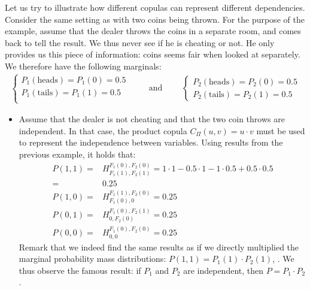 \begin{example}\label{ex:copulas}
    Let us try to illustrate how different copulas can represent different dependencies. 
    Consider the same setting as  with two coins being thrown. For the purpose of the example, assume that the dealer throws the coins in a separate room, and comes back to tell the result. We thus never see if he is cheating or not. He only provides us this piece of information: coins seems fair when looked at separately. We therefore have the following marginals:
    \begin{eqnarray*}
    \begin{cases}
        P_1(\text{heads}) = P_1(0) = 0.5\\
        P_1(\text{tails}) = P_1(1) = 0.5\\
    \end{cases}
    \qquad\text{ and }\qquad
    \begin{cases}
        P_2(\text{heads}) = P_2(0) = 0.5\\
        P_2(\text{tails}) = P_2(1) = 0.5
    \end{cases}
    \end{eqnarray*}
    
    \begin{itemize}
        \item Assume that the dealer is not cheating and that the two coin throws are independent. In that case, the product copula $C_\Pi(u,v)=u\cdot v$ must be used to represent the independence between variables.
        Using results from the previous example, it holds that:
        \begin{align*}
            P(1,1) =& H_{F_1(1), F_2(1)}^{F_1(0), F_2(0)} = 1\cdot1 - 0.5\cdot1 - 1\cdot0.5 + 0.5\cdot0.5\\
            =& 0.25\\
            P(1,0) =& H_{F_1(0), 0}^{F_1(1), F_2(0)} = 0.25 \\
            P(0,1) =& H_{0, F_2(0)}^{F_1(0), F_2(1)} = 0.25 \\
            P(0,0) =& H_{0, 0}^{F_1(0), F_2(0)} = 0.25
        \end{align*}
        Remark that we indeed find the same results as if we directly multiplied the marginal probability mass distributions: $P(1,1) = P_1(1)\cdot P_2(1)$, \etc. We thus observe the famous result: if $P_1$ and $P_2$ are independent, then $P=P_1\cdot P_2$.
        

\end{itemize}
\end{example}

